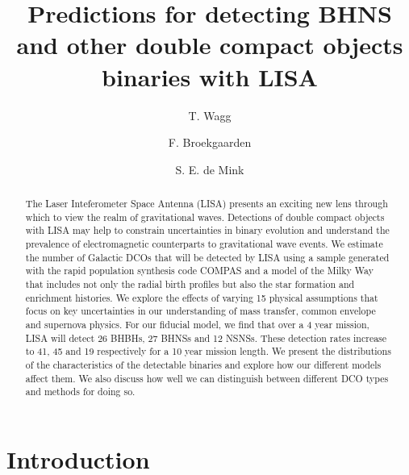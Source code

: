 \documentclass[twocolumn]{aastex63}
\begin{document}
\title{Predictions for detecting BHNS and other double compact objects binaries with LISA}


\author[0000-0001-6147-5761]{T. Wagg}

\author[0000-0002-4421-4962]{F. Broekgaarden}

\author[0000-0001-9336-2825]{S. E. de Mink}

\begin{abstract}
{The Laser Inteferometer Space Antenna (LISA) presents an exciting new lens through which to view the realm of gravitational waves. Detections of double compact objects with LISA may help to constrain uncertainties in binary evolution and understand the prevalence of electromagnetic counterparts to gravitational wave events. We estimate the number of Galactic DCOs that will be detected by LISA using a sample generated with the rapid population synthesis code COMPAS and a model of the Milky Way that includes not only the radial birth profiles but also the star formation and enrichment histories. We explore the effects of varying 15 physical assumptions that focus on key uncertainties in our understanding of mass transfer, common envelope and supernova physics. For our fiducial model, we find that over a 4 year mission, LISA will detect 26 BHBHs, 27 BHNSs and 12 NSNSs. These detection rates increase to 41, 45 and 19 respectively for a 10 year mission length. We present the distributions of the characteristics of the detectable binaries and explore how our different models affect them. We also discuss how well we can distinguish between different DCO types and methods for doing so.}
\end{abstract}


\section{Introduction} \label{sec:intro}
\end{document}
